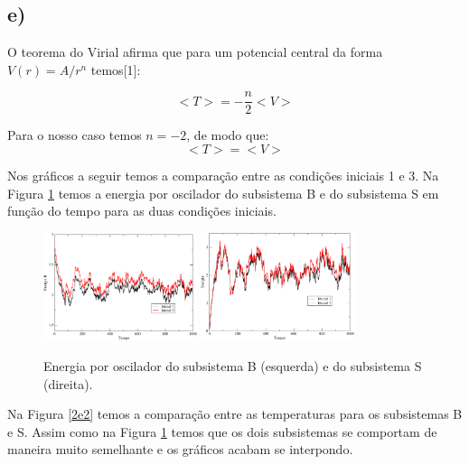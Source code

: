 \documentclass[a4wide]{report}
\begin{document}
\subsection*{e)}
O teorema do Virial afirma que para um potencial central da forma $V(r) = A/r^{n}$ temos[1]:

\begin{equation}
<T> =-\frac{n}{2} <V>
\end{equation}

Para o nosso caso temos $ n = -2$, de modo que:
\begin{equation}
<T> = <V>
\end{equation}

Nos gráficos a seguir temos a comparação entre as condições iniciais 1 e 3. Na Figura \ref{2e1} temos a energia por oscilador do subsistema B e do subsistema S em função do tempo para as duas condições iniciais. 

\begin{figure}[!htb]
\centering
\includegraphics[width=0.4\textwidth]{ETB.pdf}
\includegraphics[width=0.4\textwidth]{ETS.pdf}
\caption{Energia por oscilador do subsistema B (esquerda) e do subsistema S (direita).}
\label{2e1}
\end{figure}

Na Figura \ref{2e2} temos a comparação entre as temperaturas para os subsistemas B e S. Assim como na Figura \ref{2e1} temos que os dois subsistemas se comportam de maneira muito semelhante e os gráficos acabam se interpondo.
\end{document}
